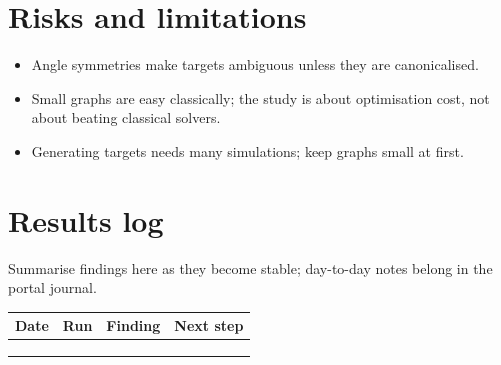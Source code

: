 \documentclass[11pt,a4paper]{article}
\begin{document}
\section{Risks and limitations}
\begin{itemize}
  \item Angle symmetries make targets ambiguous unless they are canonicalised.
  \item Small graphs are easy classically; the study is about optimisation cost, not about beating classical solvers.
  \item Generating targets needs many simulations; keep graphs small at first.
\end{itemize}

\section{Results log}
\label{sec:log}
Summarise findings here as they become stable; day-to-day notes belong in the portal journal.

\begin{table}[h]
\centering\small
\begin{tabularx}{\linewidth}{@{}l l >{\raggedright}X >{\raggedright\arraybackslash}X@{}}
\toprule
Date & Run & Finding & Next step \\
\midrule
 & & & \\
 & & & \\
 & & & \\
\bottomrule
\end{tabularx}
\end{table}



\end{document}
